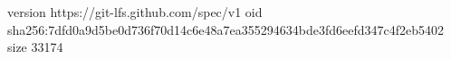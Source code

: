 version https://git-lfs.github.com/spec/v1
oid sha256:7dfd0a9d5be0d736f70d14c6e48a7ea355294634bde3fd6eefd347c4f2eb5402
size 33174
